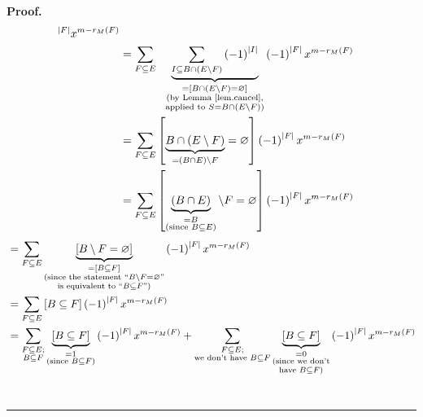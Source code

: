 \documentclass[numbers=enddot,12pt,final,onecolumn,notitlepage]{scrartcl}%
\theoremstyle{definition}
\newenvironment{proof}[1][Proof]{\noindent\textbf{#1.} }{\ \rule{0.5em}{0.5em}}
\newenvironment{verlong}{}{}
\let\sumnonlimits\sum
\renewcommand{\sum}{\sumnonlimits\limits}
\begin{document}
\begin{verlong}
\begin{proof}
\begin{align*}
^{\left\vert F\right\vert }x^{m-r_{M}\left(  F\right)  }\\
&  =\sum_{F\subseteq E}\ \ \underbrace{\sum_{I\subseteq B\cap\left(
E\setminus F\right)  }\left(  -1\right)  ^{\left\vert I\right\vert }%
}_{\substack{=\left[  B\cap\left(  E\setminus F\right)  =\varnothing\right]
\\\text{(by Lemma \ref{lem.cancel},}\\\text{applied to }S=B\cap\left(
E\setminus F\right)  \text{)}}}\left(  -1\right)  ^{\left\vert F\right\vert
}x^{m-r_{M}\left(  F\right)  }\\
&  =\sum_{F\subseteq E}\left[  \underbrace{B\cap\left(  E\setminus F\right)
}_{=\left(  B\cap E\right)  \setminus F}=\varnothing\right]  \left(
-1\right)  ^{\left\vert F\right\vert }x^{m-r_{M}\left(  F\right)  }\\
&  =\sum_{F\subseteq E}\left[  \underbrace{\left(  B\cap E\right)
}_{\substack{=B\\\text{(since }B\subseteq E\text{)}}}\setminus F=\varnothing
\right]  \left(  -1\right)  ^{\left\vert F\right\vert }x^{m-r_{M}\left(
F\right)  }%
\end{align*}%
\begin{align*}
&  =\sum_{F\subseteq E}\underbrace{\left[  B\setminus F=\varnothing\right]
}_{\substack{=\left[  B\subseteq F\right]  \\\text{(since the statement
\textquotedblleft}B\setminus F=\varnothing\text{\textquotedblright}\\\text{is
equivalent to \textquotedblleft}B\subseteq F\text{\textquotedblright)}%
}}\left(  -1\right)  ^{\left\vert F\right\vert }x^{m-r_{M}\left(  F\right)
}\\
&  =\sum_{F\subseteq E}\left[  B\subseteq F\right]  \left(  -1\right)
^{\left\vert F\right\vert }x^{m-r_{M}\left(  F\right)  }\\
&  =\sum_{\substack{F\subseteq E;\\B\subseteq F}}\underbrace{\left[
B\subseteq F\right]  }_{\substack{=1\\\text{(since }B\subseteq F\text{)}%
}}\left(  -1\right)  ^{\left\vert F\right\vert }x^{m-r_{M}\left(  F\right)
}+\sum_{\substack{F\subseteq E;\\\text{we don't have }B\subseteq
F}}\underbrace{\left[  B\subseteq F\right]  }_{\substack{=0\\\text{(since we
don't}\\\text{have }B\subseteq F\text{)}}}\left(  -1\right)  ^{\left\vert
F\right\vert }x^{m-r_{M}\left(  F\right)  }\\

\end{align*}
\end{proof}
\end{verlong}
\end{document}
